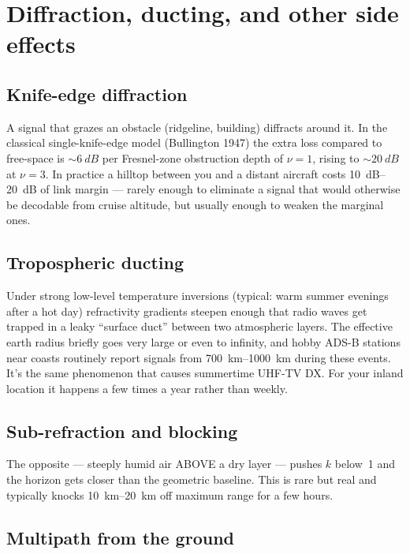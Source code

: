\documentclass[11pt,a4paper]{article}
\begin{document}
\section{Diffraction, ducting, and other side effects}\label{sec:sideeffects}

\subsection{Knife-edge diffraction}

A signal that grazes an obstacle (ridgeline, building) diffracts around
it.  In the classical single-knife-edge model (Bullington 1947) the
extra loss compared to free-space is $\sim\!\SI{6}{dB}$ per Fresnel-zone
obstruction depth of $\nu = 1$, rising to $\sim\!\SI{20}{dB}$ at $\nu = 3$.
In practice a hilltop between you and a distant aircraft costs
\SIrange{10}{20}{dB} of link margin --- rarely enough to eliminate a
signal that would otherwise be decodable from cruise altitude, but
usually enough to weaken the marginal ones.

\subsection{Tropospheric ducting}

Under strong low-level temperature inversions (typical: warm summer
evenings after a hot day) refractivity gradients steepen enough that
radio waves get trapped in a leaky ``surface duct'' between two
atmospheric layers.  The effective earth radius briefly goes very
large or even to infinity, and hobby ADS-B stations near coasts
routinely report signals from \SIrange{700}{1000}{km} during these
events.  It's the same phenomenon that causes summertime UHF-TV DX.
For your inland location it happens a few times a year rather than
weekly.

\subsection{Sub-refraction and blocking}

The opposite --- steeply humid air ABOVE a dry layer --- pushes $k$
below~1 and the horizon gets closer than the geometric baseline.  This
is rare but real and typically knocks \SIrange{10}{20}{km} off maximum
range for a few hours.

\subsection{Multipath from the ground}
\end{document}
